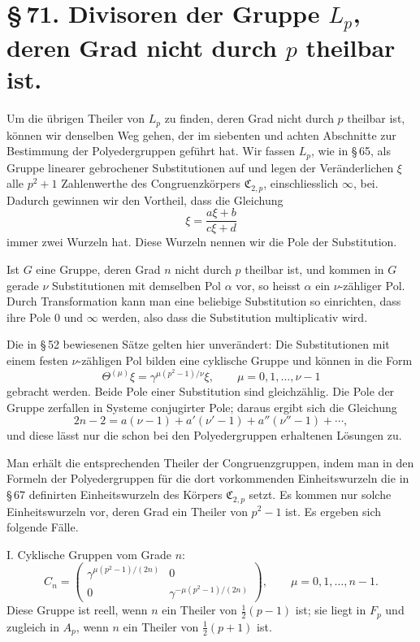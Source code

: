 \documentclass[11pt]{article}
\providecommand{\mat}[4]{\begin{pmatrix}#1&#2\\#3&#4\end{pmatrix}}
\providecommand{\mat}[4]{\begin{pmatrix}#1&#2\\#3&#4\end{pmatrix}}
\providecommand{\Cfield}{\mathfrak C}
\begin{document}
\section*{\S\,71. Divisoren der Gruppe $L_p$, deren Grad nicht durch $p$ theilbar ist.}

Um die übrigen Theiler von $L_p$ zu finden, deren Grad nicht durch $p$ theilbar ist, können wir denselben Weg gehen, der im siebenten und achten Abschnitte zur Bestimmung der Polyedergruppen geführt hat. Wir fassen $L_p$, wie in \S\,65, als Gruppe linearer gebrochener Substitutionen auf und legen der Veränderlichen $\xi$ alle $p^2+1$ Zahlenwerthe des Congruenzkörpers $\Cfield_{2,p}$, einschliesslich $\infty$, bei. Dadurch gewinnen wir den Vortheil, dass die Gleichung
\begin{equation}
 \xi=\frac{a\xi+b}{c\xi+d}
 \tag{1}
\end{equation}
immer zwei Wurzeln hat. Diese Wurzeln nennen wir die Pole der Substitution.

Ist $G$ eine Gruppe, deren Grad $n$ nicht durch $p$ theilbar ist, und kommen in $G$ gerade $\nu$ Substitutionen mit demselben Pol $\alpha$ vor, so heisst $\alpha$ ein $\nu$-zähliger Pol. Durch Transformation kann man eine beliebige Substitution so einrichten, dass ihre Pole $0$ und $\infty$ werden, also dass die Substitution multiplicativ wird.

Die in \S\,52 bewiesenen Sätze gelten hier unverändert: Die Substitutionen mit einem festen $\nu$-zähligen Pol bilden eine cyklische Gruppe und können in die Form
\begin{equation}
 \Theta^{(\mu)}\xi=\gamma^{\mu(p^2-1)/\nu}\xi,
 \qquad \mu=0,1,\ldots,\nu-1
 \tag{2}
\end{equation}
gebracht werden. Beide Pole einer Substitution sind gleichzählig. Die Pole der Gruppe zerfallen in Systeme conjugirter Pole; daraus ergibt sich die Gleichung
\begin{equation}
 2n-2=a(\nu-1)+a'(\nu'-1)+a''(\nu''-1)+\cdots,
 \tag{3}
\end{equation}
und diese lässt nur die schon bei den Polyedergruppen erhaltenen Lösungen zu.

Man erhält die entsprechenden Theiler der Congruenzgruppen, indem man in den Formeln der Polyedergruppen für die dort vorkommenden Einheitswurzeln die in \S\,67 definirten Einheitswurzeln des Körpers $\Cfield_{2,p}$ setzt. Es kommen nur solche Einheitswurzeln vor, deren Grad ein Theiler von $p^2-1$ ist. Es ergeben sich folgende Fälle.

I. Cyklische Gruppen vom Grade $n$:
\begin{equation}
 C_n=\mat{\gamma^{\mu(p^2-1)/(2n)}}{0}{0}{\gamma^{-\mu(p^2-1)/(2n)}},
 \qquad \mu=0,1,\ldots,n-1.
 \tag{4}
\end{equation}
Diese Gruppe ist reell, wenn $n$ ein Theiler von $\frac12(p-1)$ ist; sie liegt in $F_p$ und zugleich in $A_p$, wenn $n$ ein Theiler von $\frac12(p+1)$ ist.
\end{document}
